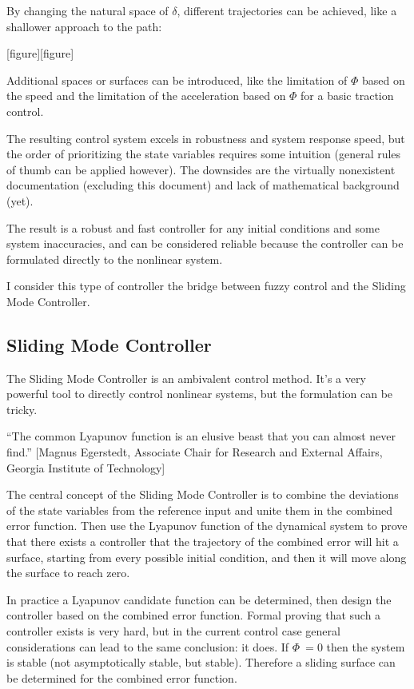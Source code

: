 By changing the natural space of $\delta$, different trajectories can be achieved, like a shallower approach to the path:

[figure][figure]

Additional spaces or surfaces can be introduced, like the limitation of $\Phi$ based on the speed and the limitation of the acceleration based on $\Phi$ for a basic traction control.

The resulting control system excels in robustness and system response speed, but the order of prioritizing the state variables requires some intuition (general rules of thumb can be applied however).
The downsides are the virtually nonexistent documentation (excluding this document) and lack of mathematical background (yet).

The result is a robust and fast controller for any initial conditions and some system inaccuracies, and can be considered reliable because the controller can be formulated directly to the nonlinear system.

I consider this type of controller the bridge between fuzzy control and the Sliding Mode Controller.

\subsection{Sliding Mode Controller}

The Sliding Mode Controller is an ambivalent control method. It’s a very powerful tool to directly control nonlinear systems, but the formulation can be tricky.

“The common Lyapunov function is an elusive beast that you can almost never find.” [Magnus Egerstedt, Associate Chair for Research and External Affairs, Georgia Institute of Technology]

The central concept of the Sliding Mode Controller is to combine the deviations of the state variables from the reference input and unite them in the combined error function. Then use the Lyapunov function of the dynamical system to prove that there exists a controller that the trajectory of the combined error will hit a surface, starting from every possible initial condition, and then it will move along the surface to reach zero.

In practice a Lyapunov candidate function can be determined, then design the controller based on the combined error function.
Formal proving that such a controller exists is very hard, but in the current control case general considerations can lead to the same conclusion: it does. If $\Phi ~= 0$ then the system is stable (not asymptotically stable, but stable). Therefore a sliding surface can be determined for the combined error function.

